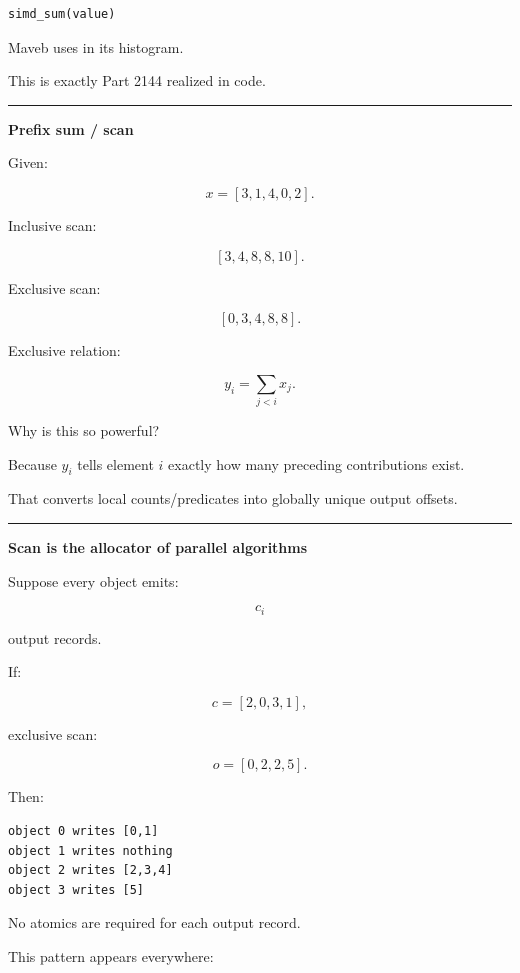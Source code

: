 \protect{}\label{jheza8}%
\begin{verbatim}
simd_sum(value)
\end{verbatim}

Maveb uses  in its histogram.

This is exactly Part 2144 realized in code.

\begin{center}\rule{0.5\linewidth}{0.5pt}\end{center}

\textbf{Prefix sum / scan}

Given:

\[
x=
[3,1,4,0,2].
\]

Inclusive scan:

\[
[3,4,8,8,10].
\]

Exclusive scan:

\[
\boxed{
[0,3,4,8,8].
}
\]

Exclusive relation:

\[
y_i=
\sum_{j<i}x_j.
\]

Why is this so powerful?

Because \(y_i\) tells element \(i\) exactly how many preceding contributions exist.

That converts local counts/predicates into globally unique output offsets.

\begin{center}\rule{0.5\linewidth}{0.5pt}\end{center}

\textbf{Scan is the allocator of parallel algorithms}

Suppose every object emits:

\[
c_i
\]

output records.

If:

\[
c=[2,0,3,1],
\]

exclusive scan:

\[
o=[0,2,2,5].
\]

Then:

\protect{}\label{9j7ww5}%
\begin{verbatim}
object 0 writes [0,1]
object 1 writes nothing
object 2 writes [2,3,4]
object 3 writes [5]
\end{verbatim}

No atomics are required for each output record.

This pattern appears everywhere:


